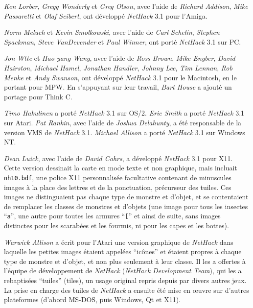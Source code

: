 \documentclass[titlepage]{article}
\begin{document}
\medskip
\noindent \textit{Ken Lorber}, \textit{Gregg Wonderly} et \textit{Greg Olson}, avec l'aide
de \textit{Richard Addison}, \textit{Mike Passaretti} et \textit{Olaf Seibert},
ont développé \textit{NetHack} 3.1 pour l'Amiga.

\medskip
\noindent \textit{Norm Meluch} et \textit{Kevin Smolkowski}, avec l'aide de
\textit{Carl Schelin}, \textit{Stephen Spackman}, \textit{Steve VanDevender}
et \textit{Paul Winner}, ont porté \textit{NetHack} 3.1 sur PC.

\medskip
\noindent \textit{Jon W\textbraceleft tte} et \textit{Hao-yang Wang},
avec l'aide de \textit{Ross Brown}, \textit{Mike Engber}, \textit{David Hairston},
\textit{Michael Hamel}, \textit{Jonathan Handler}, \textit{Johnny Lee},
\textit{Tim Lennan}, \textit{Rob Menke} et \textit{Andy Swanson},
ont développé \textit{NetHack} 3.1 pour le Macintosh, en le portant pour MPW.
En s'appuyant sur leur travail, \textit{Bart House} a ajouté un portage pour Think C.

\medskip
\noindent \textit{Timo Hakulinen} a porté \textit{NetHack} 3.1 sur OS/2.
\textit{Eric Smith} a porté \textit{NetHack} 3.1 sur Atari.
\textit{Pat Rankin}, avec l'aide de \textit{Joshua Delahunty},
a été responsable de la version VMS de \textit{NetHack} 3.1.
\textit{Michael Allison} a porté \textit{NetHack} 3.1 sur Windows NT.

\medskip
\noindent \textit{Dean Luick}, avec l'aide de \textit{David Cohrs}, a développé
\textit{NetHack} 3.1 pour X11.
Cette version dessinait la carte en mode texte et non graphique, mais
incluait \texttt{nh10.bdf}, une police X11 personnalisée facultative contenant
de minuscules images à la place des lettres et de la ponctuation, précurseur des tuiles.
Ces images ne distinguaient pas chaque type de monstre et d'objet, et se contentaient
de remplacer les classes de monstres et d'objets (une image pour tous les
insectes ``\texttt{a}'', une autre pour toutes les armures ``\texttt{[}'' et ainsi
de suite, sans images distinctes pour les scarabées et les fourmis, ni pour les capes et les bottes).

\medskip
\noindent \textit{Warwick Allison} a écrit pour l'Atari une version graphique
de \textit{NetHack}
dans laquelle les petites images étaient appelées ``icônes'' et
étaient propres à chaque type de monstre et d'objet, et non plus seulement
à leur classe.
Il les a offertes à l'équipe de développement de \textit{NetHack} (\textit{NetHack Development Team}), qui les a
rebaptisées ``tuiles'' (tiles), un usage original repris depuis
par divers autres jeux.
La prise en charge des tuiles de \textit{NetHack} a ensuite été mise en œuvre sur d'autres plateformes
(d'abord MS-DOS, puis Windows, Qt et X11).
\end{document}

